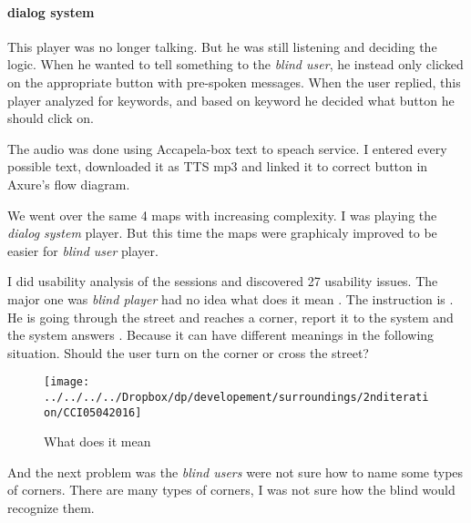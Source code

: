 				\paragraph{dialog system}
					This player was no longer talking. But he was still listening and deciding the logic. When he wanted to tell something to the \emph{blind user}, he instead only clicked on the appropriate button with pre-spoken messages. When the user replied, this player analyzed for keywords, and based on keyword he decided what button he should click on.
					
				
				The audio was done using Accapela-box text to speach service\cite{accapela}. I entered every possible text, downloaded it as TTS mp3 and linked it to correct button in Axure's flow diagram.
				
				We went over the same 4 maps with increasing complexity. I was playing the \emph{dialog system} player. But this time the maps were graphicaly improved to be easier for \emph{blind user} player.
				
				I did usability analysis of the sessions and discovered 27 usability issues. The major one was \emph{blind player} had no idea what does it mean . The instruction is . He is going through the street and reaches a corner, report it to the system and the system answers . Because it can have different meanings in the following situation. Should the user turn on the corner or cross the street?
						
		
				\begin{figure}[th]
					\centering
					\texttt{[image: ../../../../Dropbox/dp/developement/surroundings/2nditeration/CCI05042016]}
					\caption{What does it mean }
					\label{fig:what-does-continue-mean}
				\end{figure}
			
				
					
					And the next problem was the \emph{blind users} were not sure how to name some types of corners. There are many types of corners, I was not sure how the blind would recognize them.
					
